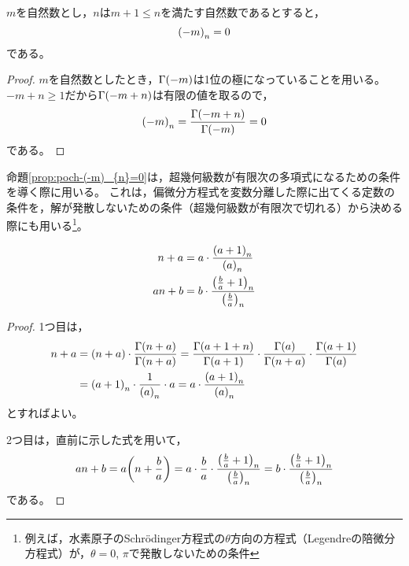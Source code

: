 \documentclass[a4paper,draft]{ltjsarticle}
\begin{document}
\begin{prop}\label{prop:poch-(-m)_{n}=0}
    $m$を自然数とし，$n$は$m+1\leq n$を満たす自然数であるとすると，
    \begin{equation}
        \poch{-m}{n}=0
    \end{equation}
    である。
    \begin{proof}
        $m$を自然数としたとき，$\fun{\Gamma}{-m}$は1位の極になっていることを用いる。
        $-m+n\geq 1$だから$\fun{\Gamma}{-m+n}$は有限の値を取るので，
        \begin{align}
            \poch{-m}{n}=\frac{\fun{\Gamma}{-m+n}}{\fun{\Gamma}{-m}}=0
        \end{align}
        である。
    \end{proof}
\end{prop}

命題\ref{prop:poch-(-m)_{n}=0}は，超幾何級数が有限次の多項式になるための条件を導く際に用いる。
これは，偏微分方程式を変数分離した際に出てくる定数の条件を，解が発散しないための条件（超幾何級数が有限次で切れる）から決める際にも用いる\footnote{例えば，水素原子のSchr\"{o}dinger方程式の$\theta$方向の方程式（Legendreの陪微分方程式）が，$\theta=0$, $\pi$で発散しないための条件}。

\begin{prop}\label{prop:poch-an+b}
    \begin{align}
        n+a&=a\cdot \frac{\poch{a+1}{n}}{\poch{a}{n}}
        \\
        an+b&=b\cdot \frac{\poch{\frac{b}{a}+1}{n}}{\poch{\frac{b}{a}}{n}} 
    \end{align}
    \begin{proof}
        1つ目は，
        \begin{align}
            n+a&=\pare{n+a}\cdot\frac{\fun{\Gamma}{n+a}}{\fun{\Gamma}{n+a}}
            =\Poch{a+1}{n}\cdot \frac{\fun{\Gamma}{a}}{\fun{\Gamma}{n+a}}\cdot\frac{\fun{\Gamma}{a+1}}{\fun{\Gamma}{a}}
            \\
            &=\poch{a+1}{n}\cdot\frac{1}{\poch{a}{n}}\cdot a=a\cdot \frac{\poch{a+1}{n}}{\poch{a}{n}}
        \end{align}
        とすればよい。

        2つ目は，直前に示した式を用いて，
        \begin{equation}
            an+b=a\pare{n+\frac{b}{a}}
            =a\cdot \frac{b}{a}\cdot \frac{\poch{\frac{b}{a}+1}{n}}{\poch{\frac{b}{a}}{n}}=b\cdot \frac{\poch{\frac{b}{a}+1}{n}}{\poch{\frac{b}{a}}{n}} 
        \end{equation}
        である。
    \end{proof}
\end{prop}
\end{document}
